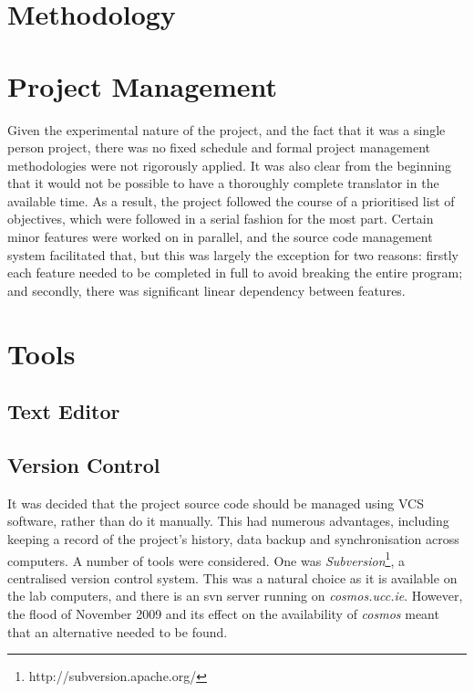 \section{Methodology}


\section{Project Management}

Given the experimental nature of the project, and the fact that it was a single
person project, there was no fixed schedule and formal project management
methodologies were not rigorously applied. It was also clear from the beginning
that it would not be possible to have a thoroughly complete translator in the
available time. As a result, the project followed the course of a prioritised
list of objectives, which were followed in a serial fashion for the most part.
Certain minor features were worked on in parallel, and the source code
management system facilitated that, but this was largely the exception for two
reasons: firstly each feature needed to be completed in full to avoid breaking
the entire program; and secondly, there was significant linear dependency
between features.


\section{Tools}

\subsection{Text Editor}

\subsection{Version Control}

It was decided that the project source code should be managed using VCS
software, rather than do it manually. This had numerous advantages, including
keeping a record of the project's history, data backup and synchronisation
across computers. A number of tools were considered. One was
\emph{Subversion}\footnote{http://subversion.apache.org/}, a centralised version
control system. This was a natural choice as it is available on the lab
computers, and there is an svn server running on \emph{cosmos.ucc.ie}. However,
the flood of November 2009 and its effect on the availability of \emph{cosmos}
meant that an alternative needed to be found.


